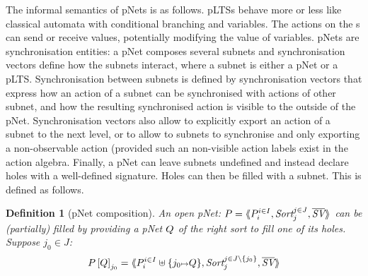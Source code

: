 \documentclass{lmcs}
\newtheorem{definition}{Definition}
\begin{document}
The informal semantics of pNets is as follows. pLTSs behave more or less like  classical automata with conditional branching and variables. The actions on the \pLTS s can send or receive values, potentially modifying the value of variables. 
pNets are synchronisation entities: a pNet composes several subnets and  synchronisation vectors define how the subnets interact, where a subnet is either a pNet or a pLTS. Synchronisation between subnets is defined by synchronisation vectors that express how an action of a subnet can be synchronised with actions of other subnet, and how the resulting synchronised action is visible to the outside of the pNet. Synchronisation vectors also allow to explicitly export an action of a subnet to the next level, or to allow to subnets to synchronise and only exporting a non-observable action (provided such an non-visible action labels exist in the action algebra. Finally, a pNet can leave subnets undefined and instead declare holes with a well-defined signature. Holes can then be filled with a subnet. This is defined as follows.



\begin{definition}[pNet composition]
	An open pNet: $\pNet = \mylangle \pNet_i^{i\in I}, \Sort_j^{j\in J}, 
	\set{\symb{SV}}\myrangle$
 can be (partially) filled by providing  a pNet $Q$ of the
	right sort to fill one of  its holes.	
	Suppose $j_0\in J$:
	\[\pNet\left[\pNetQ\right]_{j_0}= \mylangle 
	\pNet_i^{i\in I}\uplus\{j_0\mapsto \pNetQ\},\Sort_j^{j\in J\setminus \{j_0\}},
	\set{\symb{SV}}\myrangle
	\]
\end{definition}
\end{document}
